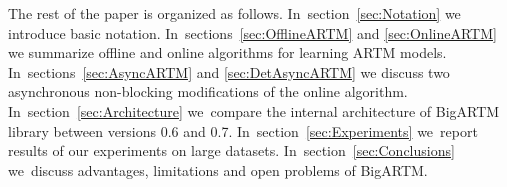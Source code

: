 \documentclass[russian,english]{llncs}
\newcommand{\kw}[1]{\textsf{#1}}
\begin{document}


The rest of the paper is organized as follows.
In~section~\ref{sec:Notation}
we introduce basic notation.
In~sections~\ref{sec:OfflineARTM} and \ref{sec:OnlineARTM}
we summarize offline and online algorithms for learning ARTM models.
In~sections~\ref{sec:AsyncARTM} and \ref{sec:DetAsyncARTM}
we discuss two asynchronous non-blocking modifications of the online algorithm.
In~section~\ref{sec:Architecture}
we~compare the internal architecture of BigARTM library between versions \kw{0.6} and \kw{0.7}.
In~section~\ref{sec:Experiments}
we~report results of our experiments on large datasets.
In~section~\ref{sec:Conclusions}
we~discuss advantages, limitations and open problems of BigARTM.

\end{document}
